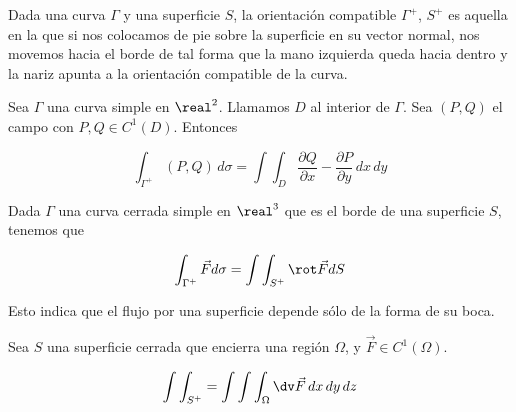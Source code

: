 \documentclass[12pt,a4paper,titlepage]{apuntes}
\begin{document}
\begin{defn}
Dada una curva $\Gamma$ y una superficie $S$, la orientación compatible $\Gamma^+$, $S^+$ es aquella en la que si nos colocamos de pie sobre la superficie en su vector normal, nos movemos hacia el borde de tal forma que la mano izquierda queda hacia dentro y la nariz apunta a la orientación compatible de la curva.\end{defn}


\begin{theorem}
Sea $\Gamma$ una curva simple en $\real^2$. Llamamos $D$ al interior de $\Gamma$. Sea $(P,Q)$ el campo con $P,Q\in C^1(D)$. Entonces

\[ \int_{\Gamma^+} (P,Q)\,d\sigma = \int\int_D \frac{\partial Q}{\partial x}-\frac{\partial P}{\partial y}\,dx\,dy\]
\end{theorem}

\begin{theorem}
Dada $\Gamma$ una curva cerrada simple en $\real^3$ que es el borde de una superficie $S$, tenemos que 

\[ \int_{\Gamma^+}\vec{F}d\sigma =\int\int_{S^+}\rot \vec{F}dS \]

Esto indica que el flujo por una superficie depende sólo de la forma de su boca.

\begin{theorem}
Sea $S$ una superficie cerrada que encierra una región $\Omega$, y $\vec{F}\in C^1(\Omega)$.

\[ \int\int_{S^+} = \int\int\int_\Omega \dv \vec{F}\, dx\, dy\, dz \]
\end{theorem}
\end{theorem}

\printindex
\end{document}

